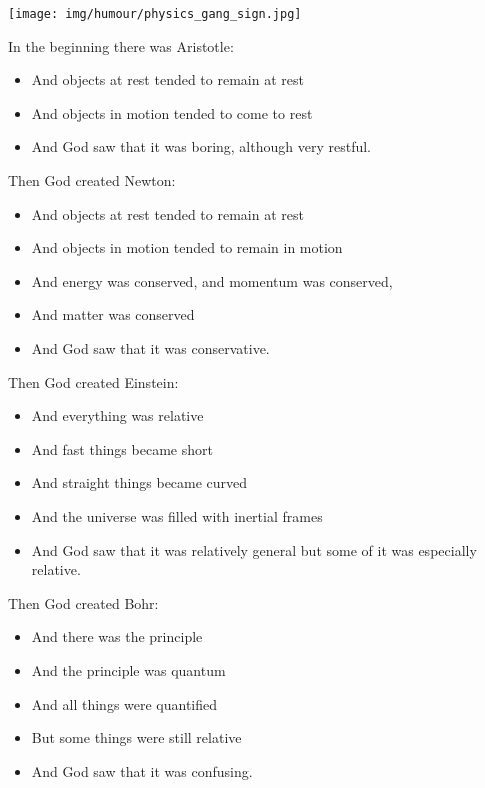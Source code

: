 \begin{center}\underline{\hspace{5 cm}}\end{center}

	\begin{center}
		\texttt{[image: img/humour/physics\_gang\_sign.jpg]}
	\end{center}
	\pagebreak

\begin{center}\underline{\hspace{5 cm}}\end{center}

In the beginning there was Aristotle:
\begin{itemize}
	\item And objects at rest tended to remain at rest
	\item And objects in motion tended to come to rest
	\item And God saw that it was boring, although very restful.
\end{itemize}

Then God created Newton:
\begin{itemize}
	\item And objects at rest tended to remain at rest
	\item And objects in motion tended to remain in motion
	\item And energy was conserved, and momentum was conserved,
	\item And matter was conserved
	\item And God saw that it was conservative.
\end{itemize}

Then God created Einstein:
\begin{itemize}
	\item And everything was relative
	\item And fast things became short
	\item And straight things became curved
	\item And the universe was filled with inertial frames
	\item And God saw that it was relatively general
but some of it was especially relative.
\end{itemize}

Then God created Bohr:
\begin{itemize}
	\item And there was the principle
	\item And the principle was quantum
	\item And all things were quantified
	\item But some things were still relative
	\item And God saw that it was confusing.
\end{itemize}

